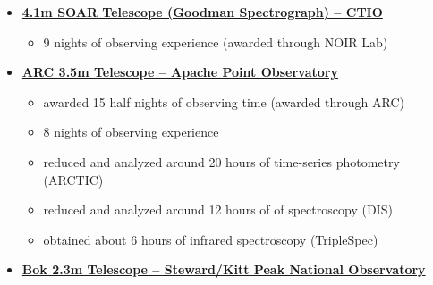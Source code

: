 \documentclass[letterpaper,12pt]{article}
\begin{document}
\vspace{3mm}
\noindent{}
\vspace{-4mm}
\begin{itemize}
\item \href{http://www.ctio.noao.edu/soar/}{\textbf{4.1m SOAR Telescope (Goodman Spectrograph) -- CTIO}}
\begin{itemize}\vspace{-3mm}
    \item 9 nights of observing experience (awarded through NOIR Lab)
\end{itemize}
\item \href{https://www.apo.nmsu.edu/arc35m/}{\textbf{ARC 3.5m Telescope -- Apache Point Observatory}}
\begin{itemize}\vspace{-3mm}
    \item awarded 15 half nights of observing time (awarded through ARC)\vspace{-1mm}
    \item 8 nights of observing experience\vspace{-1mm}
    \item reduced and analyzed around 20 hours of time-series photometry (ARCTIC)\vspace{-1mm}
    \item reduced and analyzed around 12 hours of of spectroscopy (DIS)\vspace{-1mm}
    \item obtained about 6 hours of infrared spectroscopy (TripleSpec)\vspace{-1mm}
\end{itemize}
\item \href{https://www.as.arizona.edu/bok-23m-telescope}{\textbf{Bok 2.3m Telescope -- Steward/Kitt Peak National Observatory}}
\begin{itemize}\vspace{-3mm}

\end{itemize}
\end{itemize}
\end{document}
